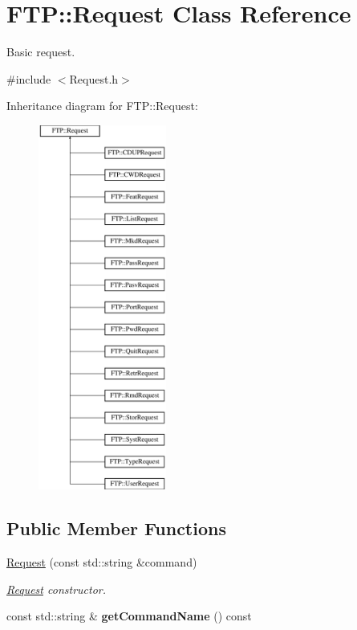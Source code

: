 \hypertarget{classFTP_1_1Request}{}\section{F\+T\+P\+:\+:Request Class Reference}
\label{classFTP_1_1Request}


Basic request.  




{\ttfamily \#include $<$Request.\+h$>$}

Inheritance diagram for F\+T\+P\+:\+:Request\+:\begin{figure}[H]
\begin{center}
\leavevmode
\includegraphics[height=12.000000cm]{classFTP_1_1Request}
\end{center}
\end{figure}
\subsection*{Public Member Functions}
\begin{DoxyCompactItemize}
\item 
\hyperlink{classFTP_1_1Request_a0ac0823bc06e65b29b01c6f260e949c4}{Request} (const std\+::string \&command)
\begin{DoxyCompactList}\small\item\em \hyperlink{classFTP_1_1Request}{Request} constructor. \end{DoxyCompactList}\item 
\hypertarget{classFTP_1_1Request_a450bfde1fc4c9c1f159426b738ffb28a}{}const std\+::string \& {\bfseries get\+Command\+Name} () const \label{classFTP_1_1Request_a450bfde1fc4c9c1f159426b738ffb28a}

\end{DoxyCompactItemize}


